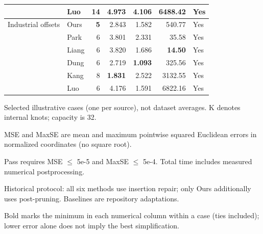 \documentclass{article}
\begin{document}
\begin{table}[htbp]
\begin{tabular}{llrrrrl}
 & Luo & 14 & 4.973 & 4.106 & 6488.42 & Yes \\
\midrule
Industrial offsets & Ours & \textbf{5} & 2.843 & 1.582 & 540.77 & Yes \\
 & Park & 6 & 3.801 & 2.331 & 35.58 & Yes \\
 & Liang & 6 & 3.820 & 1.686 & \textbf{14.50} & Yes \\
 & Dung & 6 & 2.719 & \textbf{1.093} & 325.56 & Yes \\
 & Kang & 8 & \textbf{1.831} & 2.522 & 3132.55 & Yes \\
 & Luo & 6 & 4.176 & 1.591 & 6822.16 & Yes \\
\bottomrule
\end{tabular}
\par\smallskip\begin{minipage}{\textwidth}\footnotesize
Selected illustrative cases (one per source), not dataset averages. K denotes internal knots; capacity is 32.\par
MSE and MaxSE are mean and maximum pointwise squared Euclidean errors in normalized coordinates (no square root).\par
Pass requires MSE $\leq$ 5e-5 and MaxSE $\leq$ 5e-4. Total time includes measured numerical postprocessing.\par
Historical protocol: all six methods use insertion repair; only Ours additionally uses post-pruning. Baselines are repository adaptations.\par
Bold marks the minimum in each numerical column within a case (ties included); lower error alone does not imply the best simplification.\par
\end{minipage}
\end{table}
\end{document}
